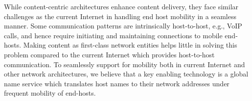 While content-centric architectures enhance content delivery, they face similar challenges as the current Internet  in handling end host mobility in a seamless manner. 
Some communication patterns are intrinsically host-to-host, e.g., VoIP calls, and hence require initiating and maintaining connections to mobile end-hosts.
Making content as first-class network entities helps little in solving this problem compared to the current Internet which provides host-to-host communication. 
To seamlessly support for mobility both in current Internet and other network architectures, we believe that a key enabling technology is a global name service which translates host names to their network addresses under frequent mobility of end-hosts.





%


%
%
%
%



